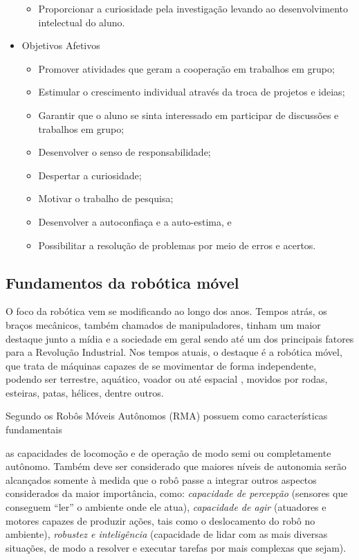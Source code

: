 \begin{itemize}
\begin{itemize}
\item Proporcionar a curiosidade pela investigação levando ao desenvolvimento intelectual do aluno.
\end{itemize}
\item Objetivos Afetivos
\begin{itemize}
\item Promover atividades que geram a cooperação em trabalhos em grupo;
\item Estimular o crescimento individual através da troca de projetos e ideias;
\item Garantir que o aluno se sinta interessado em participar de discussões e trabalhos em grupo;
\item Desenvolver o senso de responsabilidade;
\item Despertar a curiosidade;
\item Motivar o trabalho de pesquisa;
\item Desenvolver a autoconfiaça e a auto-estima, e
\item Possibilitar a resolução de problemas por meio de erros e acertos.
\end{itemize}
\end{itemize}

\subsection{Fundamentos da robótica móvel}
O foco da robótica vem se modificando ao longo dos anos. Tempos atrás, os braços mecânicos, também chamados de manipuladores, tinham um maior destaque junto a mídia e a sociedade em geral \cite{wolf2009robotica} sendo até um dos principais fatores para a Revolução Industrial. Nos tempos atuais, o destaque é a robótica móvel, que trata de máquinas capazes de se movimentar de forma independente, podendo ser terrestre, aquático, voador ou até espacial , movidos por rodas, esteiras, patas, hélices, dentre outros. 

Segundo \cite{wolf2009robotica} os Robôs Móveis Autônomos (RMA) possuem como características fundamentais

\begin{citacao}
as capacidades de locomoção e de operação de modo semi ou 
completamente autônomo. Também deve ser considerado que maiores níveis de 
autonomia serão alcançados somente à medida que o robô passe a integrar outros 
aspectos considerados da maior importância, como: \textit{capacidade de percepção} (sensores que conseguem “ler” o ambiente onde ele atua), \textit{capacidade de agir} (atuadores e motores capazes de produzir ações, tais como o deslocamento do robô no ambiente), \textit{robustez e inteligência} (capacidade de lidar com as mais diversas situações, de modo a resolver e executar tarefas por mais complexas que sejam). 
\end{citacao}


